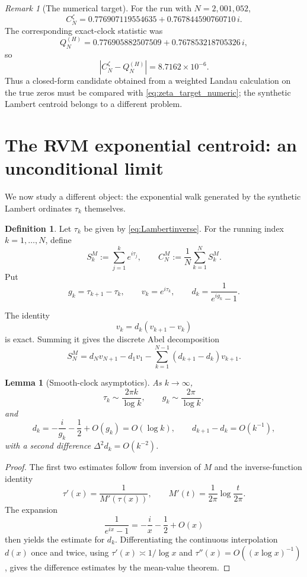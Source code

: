 \documentclass[11pt]{amsart}
\numberwithin{equation}{section}
\newtheorem{lemma}[theorem]{Lemma}
\theoremstyle{definition}
\newtheorem{definition}[theorem]{Definition}
\theoremstyle{remark}
\newtheorem{remark}[theorem]{Remark}
\begin{document}
\begin{remark}[The numerical target]\label{rem:true_zero_target}
For the run with $N=2{,}001{,}052$,
\begin{equation}\label{eq:zeta_target_numeric}
C_N^{\zeta}
=0.776907119554635+0.767844590760710\,i.
\end{equation}
The corresponding exact-clock statistic was
\begin{equation}\label{eq:QH_target_numeric}
Q_N^{(H)}
=0.776905882507509+0.767853218705326\,i,
\end{equation}
so
\begin{equation}\label{eq:finite_level1_gap}
\left|C_N^{\zeta}-Q_N^{(H)}\right|
=8.7162\times10^{-6}.
\end{equation}
Thus a closed-form candidate obtained from a weighted Landau calculation on the true zeros must be compared with \eqref{eq:zeta_target_numeric}; the synthetic Lambert centroid belongs to a different problem.
\end{remark}

\section{The RVM exponential centroid: an unconditional limit}\label{sec:rvm}

We now study a different object: the exponential walk generated by the synthetic Lambert ordinates $\tau_k$ themselves.

\begin{definition}
Let $\tau_k$ be given by \eqref{eq:Lambertinverse}. For the running index $k=1,\ldots,N$, define
\[
S_k^{M}:=\sum_{j=1}^{k}e^{i\tau_j},
\qquad
C_N^{M}:=\frac1N\sum_{k=1}^{N}S_k^M.
\]
Put
\[
g_k=\tau_{k+1}-\tau_k,
\qquad
v_k=e^{i\tau_k},
\qquad
 d_k=\frac1{e^{ig_k}-1}.
\]
\end{definition}

The identity
\[
v_k=d_k(v_{k+1}-v_k)
\]
is exact. Summing it gives the discrete Abel decomposition
\begin{equation}\label{eq:AbelSN}
S_N^{M}
=d_Nv_{N+1}-d_1v_1-
\sum_{k=1}^{N-1}(d_{k+1}-d_k)v_{k+1}.
\end{equation}

\begin{lemma}[Smooth-clock asymptotics]\label{lem:clockasym}
As $k\to\infty$,
\[
\tau_k\sim\frac{2\pi k}{\log k},\qquad
g_k\sim\frac{2\pi}{\log k},
\]
and
\[
d_k=-\frac{i}{g_k}-\frac12+O(g_k)=O(\log k),
\qquad
d_{k+1}-d_k=O(k^{-1}),
\]
with a second difference $\Delta^2d_k=O(k^{-2})$.
\end{lemma}
\begin{proof}
The first two estimates follow from inversion of $M$ and the inverse-function identity
\[
\tau'(x)=\frac1{M'(\tau(x))},\qquad
M'(t)=\frac1{2\pi}\log\frac{t}{2\pi}.
\]
The expansion
\[
\frac1{e^{ix}-1}=-\frac{i}{x}-\frac12+O(x)
\]
then yields the estimate for $d_k$. Differentiating the continuous interpolation $d(x)$ once and twice, using $\tau'(x)\asymp1/\log x$ and $\tau''(x)=O((x\log x)^{-1})$, gives the difference estimates by the mean-value theorem.
\end{proof}
\end{document}
